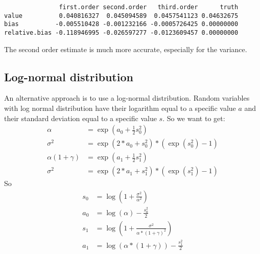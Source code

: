 \documentclass[12pt]{article}
\begin{document}
\begin{verbatim}
               first.order second.order   third.order      truth
value          0.040816327  0.045094589  0.0457541123 0.04632675
bias          -0.005510428 -0.001232166 -0.0005726425 0.00000000
relative.bias -0.118946995 -0.026597277 -0.0123609457 0.00000000
\end{verbatim}

The second order estimate is much more accurate, especially for the
variance.

\clearpage

\subsection{Log-normal distribution}
\label{sec:org35b76dc}

An alternative approach is to use a log-normal distribution. Random
variables with log normal distribution have their logarithm equal to a
specific value \(a\) and their standard deviation equal to a specific
value \(s\). So we want to get:
\begin{align*}
\alpha &= \exp(a_0 + \frac{1}{2} s_0^2) \\
\sigma^2 &= \exp(2*a_0 + s_0^2)*(\exp(s_0^2)-1) \\
\alpha (1+\gamma) &= \exp(a_1 + \frac{1}{2} s_1^2) \\
\sigma^2 &= \exp(2*a_1 + s_1^2)*(\exp(s_1^2)-1)
\end{align*}
So
\begin{align*}
s_0 &= \log\left(1+\frac{\sigma^2}{\alpha^2}\right)\\
a_0 &= \log(\alpha)-\frac{s_0^2}{2}\\
s_1 &= \log\left(1+\frac{\sigma^2}{\alpha*(1+\gamma)^2}\right)\\
a_1 &= \log(\alpha*(1+\gamma))-\frac{s_1^2}{2}
\end{align*}

\clearpage
\end{document}
